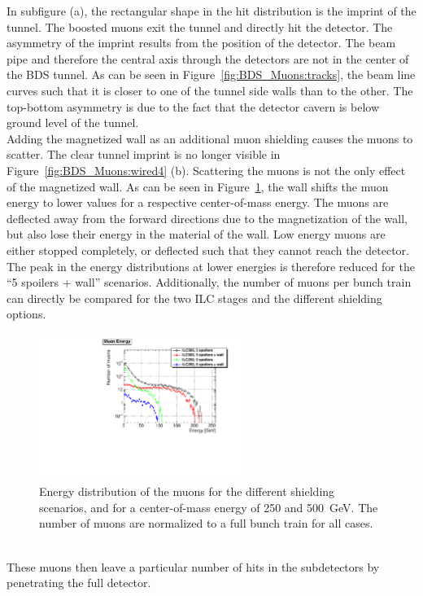 In subfigure (a), the rectangular shape in the hit distribution is the imprint of the tunnel.
The boosted muons exit the tunnel and directly hit the detector.
The asymmetry of the imprint results from the position of the detector.
The beam pipe and therefore the central axis through the detectors are not in the center of the BDS tunnel.
As can be seen in Figure~\ref{fig:BDS_Muons:tracks}, the beam line curves such that it is closer to one of the tunnel side walls than to the other.
The top-bottom asymmetry is due to the fact that the detector cavern is below ground level of the tunnel.
\\Adding the magnetized wall as an additional muon shielding causes the muons to scatter.
The clear tunnel imprint is no longer visible in Figure~\ref{fig:BDS_Muons:wired4} (b).
Scattering the muons is not the only effect of the magnetized wall.
As can be seen in Figure~\ref{fig:BDS_Muons:energy}, the wall shifts the muon energy to lower values for a respective center-of-mass energy.
The muons are deflected away from the forward directions due to the magnetization of the wall, but also lose their energy in the material of the wall.
Low energy muons are either stopped completely, or deflected such that they cannot reach the detector. %
The peak in the energy distributions at lower energies is therefore reduced for the ``5 spoilers + wall'' scenarios.
Additionally, the number of muons per bunch train can directly be compared for the two ILC stages and the different shielding options.
\begin{figure}[htbp]
\centering
\includegraphics[width=0.6\textwidth]{Figures/BDS_muons/Energy_Comparison_ILC500vsILC250.pdf}
\caption[Muon energy]{Energy distribution of the muons for the different shielding scenarios, and for a center-of-mass energy of 250 and \SI{500}{\GeV}.
The number of muons are normalized to a full bunch train for all cases.}
\label{fig:BDS_Muons:energy}
\end{figure}
\\These muons then leave a particular number of hits in the \sid subdetectors by penetrating the full detector.
